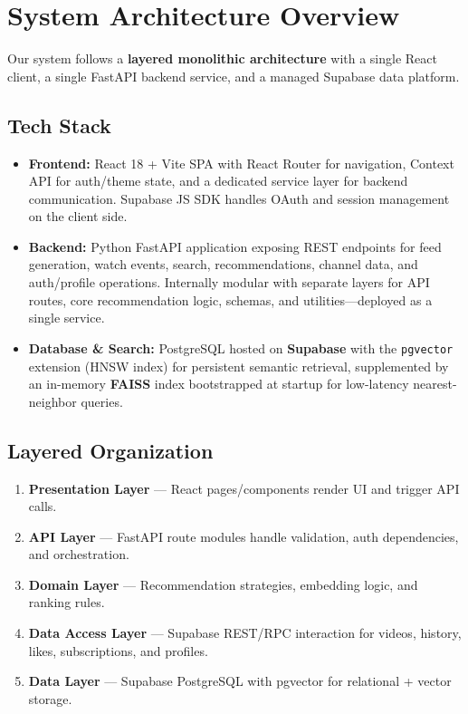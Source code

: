 \documentclass[11pt, a4paper]{report}
\begin{document}
\section{System Architecture Overview}
Our system follows a \textbf{layered monolithic architecture} with a single React client, a single FastAPI backend service, and a managed Supabase data platform.

\subsection{Tech Stack}
\begin{itemize}
    \item \textbf{Frontend:} React 18 + Vite SPA with React Router for navigation, Context API for auth/theme state, and a dedicated service layer for backend communication. Supabase JS SDK handles OAuth and session management on the client side.
    \item \textbf{Backend:} Python FastAPI application exposing REST endpoints for feed generation, watch events, search, recommendations, channel data, and auth/profile operations. Internally modular with separate layers for API routes, core recommendation logic, schemas, and utilities---deployed as a single service.
    \item \textbf{Database \& Search:} PostgreSQL hosted on \textbf{Supabase} with the \texttt{pgvector} extension (HNSW index) for persistent semantic retrieval, supplemented by an in-memory \textbf{FAISS} index bootstrapped at startup for low-latency nearest-neighbor queries.
\end{itemize}

\subsection{Layered Organization}
\begin{enumerate}
    \item \textbf{Presentation Layer} --- React pages/components render UI and trigger API calls.
    \item \textbf{API Layer} --- FastAPI route modules handle validation, auth dependencies, and orchestration.
    \item \textbf{Domain Layer} --- Recommendation strategies, embedding logic, and ranking rules.
    \item \textbf{Data Access Layer} --- Supabase REST/RPC interaction for videos, history, likes, subscriptions, and profiles.
    \item \textbf{Data Layer} --- Supabase PostgreSQL with pgvector for relational + vector storage.
\end{enumerate}
\end{document}
